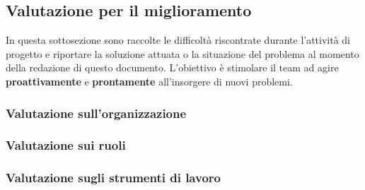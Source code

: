 \subsection{Valutazione per il miglioramento}
In questa sottosezione sono raccolte le difficoltà riscontrate durante l'attività di progetto e riportare la soluzione attuata o la situazione del problema al momento della redazione di questo documento. L'obiettivo è stimolare il team ad agire \textbf{proattivamente} e \textbf{prontamente} all'insorgere di nuovi problemi.
\subsubsection{Valutazione sull'organizzazione}
\subsubsection{Valutazione sui ruoli}
\subsubsection{Valutazione sugli strumenti di lavoro}